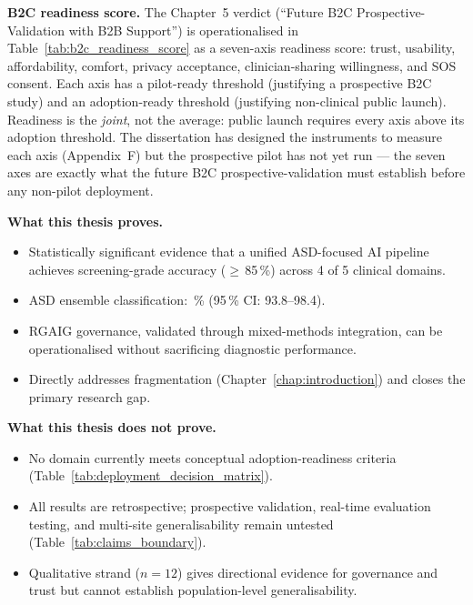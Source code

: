 

\noindent\textbf{B2C readiness score.} The Chapter~5 verdict (``Future B2C Prospective-Validation with B2B Support'') is operationalised in Table~\ref{tab:b2c_readiness_score} as a seven-axis readiness score: trust, usability, affordability, comfort, privacy acceptance, clinician-sharing willingness, and SOS consent. Each axis has a pilot-ready threshold (justifying a prospective B2C study) and an adoption-ready threshold (justifying non-clinical public launch). Readiness is the \emph{joint}, not the average: public launch requires every axis above its adoption threshold. The dissertation has designed the instruments to measure each axis (Appendix~F) but the prospective pilot has not yet run --- the seven axes are exactly what the future B2C prospective-validation must establish before any non-pilot deployment.





\noindent\textbf{What this thesis proves.}
\begin{itemize}[leftmargin=*, itemsep=2pt]
    \item Statistically significant evidence that a unified ASD-focused AI pipeline achieves screening-grade accuracy ($\geq$\,85\,\%) across 4 of 5 clinical domains.
    \item ASD ensemble classification: \mscaval\,\% (95\,\% CI: 93.8--98.4).
    \item RGAIG governance, validated through mixed-methods integration, can be operationalised without sacrificing diagnostic performance.
    \item Directly addresses fragmentation (Chapter~\ref{chap:introduction}) and closes the primary research gap.
\end{itemize}

\noindent\textbf{What this thesis does not prove.}
\begin{itemize}[leftmargin=*, itemsep=2pt]
    \item No domain currently meets conceptual adoption-readiness criteria (Table~\ref{tab:deployment_decision_matrix}).
    \item All results are retrospective; prospective validation, real-time evaluation testing, and multi-site generalisability remain untested (Table~\ref{tab:claims_boundary}).
    \item Qualitative strand ($n = 12$) gives directional evidence for governance and trust but cannot establish population-level generalisability.
\end{itemize}

